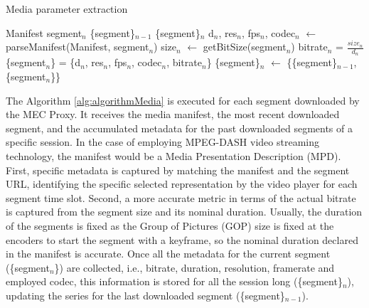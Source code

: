 \begin{algorithm}
	\renewcommand{\algorithmicrequire}{\textbf{Input:}}
	\renewcommand{\algorithmicensure}{\textbf{Output:}}
	\caption{Media parameter extraction}
	\label{alg:algorithmMedia}
	\begin{algorithmic}
		 
		\Require Manifest 
		\Require segment$_n$ 
		\Require \{segment\}$_{n-1}$ 
		\Ensure \{segment\}$_{n}$ 
		\State d$_n$, res$_n$, fps$_n$, codec$_n$ $\leftarrow$ parseManifest(Manifest, segment$_n$) 
		\State size$_n$ $\leftarrow$ getBitSize(segment$_n$) 
		\State bitrate$_n$ = $\frac{size_n}{d_n}$ 
		\State \{segment$_n$\} = \{d$_n$, res$_n$, fps$_n$, codec$_n$, bitrate$_n$\} 
		\State \{segment\}$_n$ $\leftarrow$ \{\{segment\}$_{n-1}$, \{segment$_n$\}\} 
		\EndFunction
	\end{algorithmic}
\end{algorithm}

The Algorithm \ref{alg:algorithmMedia} is executed for each segment downloaded by the MEC Proxy. It receives the media manifest, the most recent downloaded segment, and the accumulated metadata for the past downloaded segments of a specific session. In the case of employing MPEG-DASH video streaming technology, the manifest would be a Media Presentation Description (MPD). First, specific metadata is captured by matching the manifest and the segment URL, identifying the specific selected representation by the video player for each segment time slot. Second, a more accurate metric in terms of the actual bitrate is captured from the segment size and its nominal duration. Usually, the duration of the segments is fixed as the Group of Pictures (GOP) size is fixed at the encoders to start the segment with a keyframe, so the nominal duration declared in the manifest is accurate. Once all the metadata for the current segment (\{segment$_n$\}) are collected, i.e., bitrate, duration, resolution, framerate and employed codec, this information is stored for all the session long (\{segment\}$_n$), updating the series for the last downloaded segment (\{segment\}$_{n-1}$).

